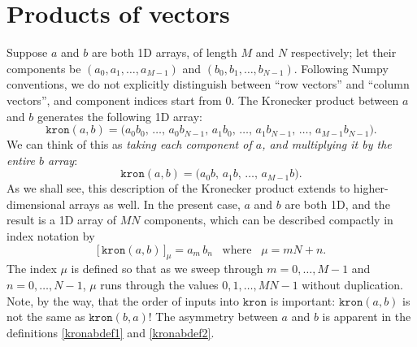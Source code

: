 \documentclass[prx,12pt]{revtex4-2}
\begin{document}
\section{Products of vectors}

Suppose $a$ and $b$ are both 1D arrays, of length $M$ and $N$
respectively; let their components be $(a_0, a_1, \dots, a_{M-1})$ and
$(b_0, b_1, \dots, b_{N-1})$.  Following Numpy conventions, we do not
explicitly distinguish between ``row vectors'' and ``column vectors'',
and component indices start from 0.  The Kronecker product between $a$
and $b$ generates the following 1D array:
\begin{equation}
  \texttt{kron}(a, b) = \Big(a_0b_0,\,\dots,\, a_0 b_{N-1},\, a_1 b_0,\, \dots,\, a_1 b_{N-1},\, \dots,\, a_{M-1}b_{N-1}\Big).\label{kronabdef1}
\end{equation}
We can think of this as \textit{taking each component of $a$, and
  multiplying it by the entire $b$ array}:
\begin{equation}
  \texttt{kron}(a, b) = \Big(a_0b,\, a_1 b,\, \dots,\, a_{M-1}b\Big).
  \label{kronabdef2}
\end{equation}
As we shall see, this description of the Kronecker product extends to
higher-dimensional arrays as well.  In the present case, $a$ and $b$
are both 1D, and the result is a 1D array of $MN$ components, which
can be described compactly in index notation by
\begin{equation}
  \big[\, \texttt{kron}(a, b) \,\big]_{\mu} = a_m \, b_n \;\;\;\mathrm{where}\;\;\;\mu = mN+n.
  \label{kronab}
\end{equation}
The index $\mu$ is defined so that as we sweep through $m =
0,\dots,M-1$ and $n = 0,\dots,N-1$, $\mu$ runs through the values
$0,1,\dots,MN-1$ without duplication.  Note, by the way, that the
order of inputs into $\texttt{kron}$ is important:
$\texttt{kron}(a,b)$ is not the same as $\texttt{kron}(b,a)$!  The
asymmetry between $a$ and $b$ is apparent in the definitions
\eqref{kronabdef1} and \eqref{kronabdef2}.
\end{document}
